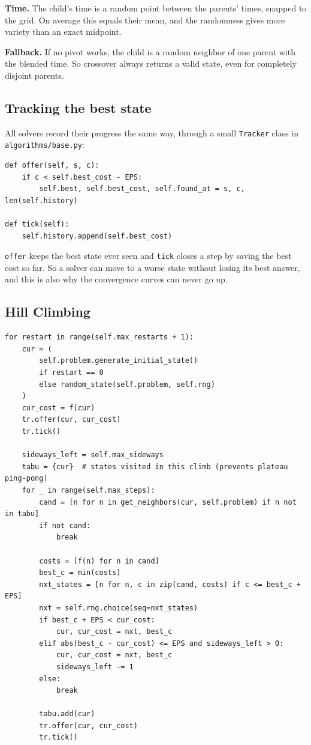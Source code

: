 \documentclass[11pt,a4paper]{article}
\newcommand{\col}[1]{\texttt{#1}}
\begin{document}
\noindent\textbf{Time.} The child's time is a random point between the parents' times, snapped to the
grid. On average this equals their mean, and the randomness gives more variety than an exact midpoint.

\noindent\textbf{Fallback.} If no pivot works, the child is a random neighbor of one parent with the
blended time. So crossover always returns a valid state, even for completely disjoint parents.

\subsection{Tracking the best state}

All solvers record their progress the same way, through a small \col{Tracker} class in
\col{algorithms/base.py}:

\begin{lstlisting}
def offer(self, s, c):
    if c < self.best_cost - EPS:
        self.best, self.best_cost, self.found_at = s, c, len(self.history)

def tick(self):
    self.history.append(self.best_cost)
\end{lstlisting}

\noindent \col{offer} keeps the best state ever seen and \col{tick} closes a step by saving the best
cost so far. So a solver can move to a worse state without losing its best answer, and this is also
why the convergence curves can never go up.

\subsection{Hill Climbing}

\begin{lstlisting}
for restart in range(self.max_restarts + 1):
    cur = (
        self.problem.generate_initial_state()
        if restart == 0
        else random_state(self.problem, self.rng)
    )
    cur_cost = f(cur)
    tr.offer(cur, cur_cost)
    tr.tick()

    sideways_left = self.max_sideways
    tabu = {cur}  # states visited in this climb (prevents plateau ping-pong)
    for _ in range(self.max_steps):
        cand = [n for n in get_neighbors(cur, self.problem) if n not in tabu]
        if not cand:
            break

        costs = [f(n) for n in cand]
        best_c = min(costs)
        nxt_states = [n for n, c in zip(cand, costs) if c <= best_c + EPS]
        nxt = self.rng.choice(seq=nxt_states)
        if best_c + EPS < cur_cost:
            cur, cur_cost = nxt, best_c
        elif abs(best_c - cur_cost) <= EPS and sideways_left > 0:
            cur, cur_cost = nxt, best_c
            sideways_left -= 1
        else:
            break

        tabu.add(cur)
        tr.offer(cur, cur_cost)
        tr.tick()
\end{lstlisting}
\end{document}

